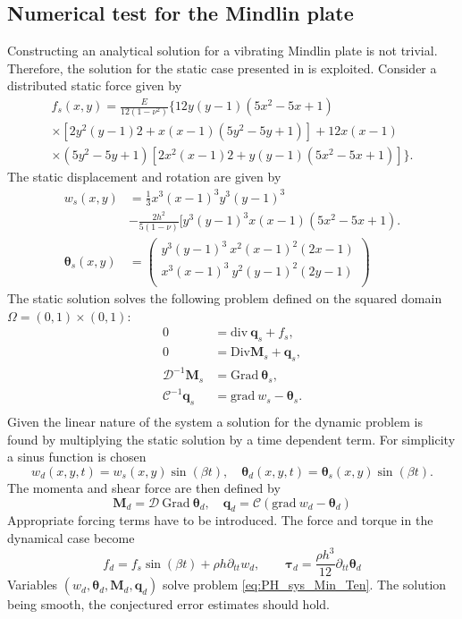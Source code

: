 \documentclass{ifacconf}
\begin{document}
\subsection{Numerical test for the Mindlin plate}
Constructing an analytical solution for a vibrating Mindlin plate is not trivial. Therefore, the solution for the static case presented in \cite{mindlinVeiga} is exploited. Consider a distributed static force given by 
\begin{equation*}
\begin{aligned}
f_s(x,y)=\frac{E}{12 (1-\nu^2)} \{12 y(y-1)(5x^2-5x+1)\\
\times [2y^2(y-1)2+x(x-1)(5y^2-5y+1)] +12x(x-1)\\
\times (5y^2-5y+1)[2x^2(x-1)2+y(y-1)(5x^2-5x+1)]\}.
\end{aligned}
\end{equation*}
The static displacement and rotation are given by
\begin{align*}
	w_s(x,y) &= \frac{1}{3} x^3(x-1)^3 y^3 (y-1)^3\\
	&-\frac{2 h^2}{5(1-\nu)}[y^3(y-1)^3 x(x-1)(5 x^2-5x+1). \\
	\bm{\theta}_{s}(x,y) &= 
	\begin{pmatrix}
	y^3(y-1)^3 \ x^2 (x-1)^2 (2x-1) \\
	x^3(x-1)^3 \ y^2 (y-1)^2 (2y-1) \\
	\end{pmatrix}
\end{align*}
The static solution solves the following problem defined on the squared domain $\Omega=(0,1)\times(0,1)$:
\begin{equation}
\begin{aligned}
0 &= \mathrm{div} \ \bm{q}_s + f_s , \\
0 &= \mathrm{Div} \bm{M}_s + \bm{q}_s, \\
\mathcal{D}^{-1} \bm{M}_s &= \mathrm{Grad} \ \bm{\theta}_s, \\
\mathcal{C}^{-1} \bm{q}_s &= \mathrm{grad} \ w_s - \bm{\theta}_s. \\
\end{aligned}
\end{equation}
Given the linear nature of the system a solution for the dynamic problem is found by multiplying the static solution by a time dependent term. For simplicity a sinus function is chosen
\[
w_d(x,y,t) = w_s(x,y) \sin(\beta t), \quad \bm{\theta}_d(x,y,t) = \bm\theta_s(x,y) \sin(\beta t).
\]
The momenta and shear force are then defined by
\[
\bm{M}_d = \mathcal{D} \ \mathrm{Grad} \ \bm{\theta}_d, \quad \bm{q}_d = \mathcal{C}(\mathrm{grad} \ w_d - \bm{\theta}_d)
\]
Appropriate forcing terms have to be introduced. The force and torque in the dynamical case become
\begin{equation*}
f_d = f_s \sin(\beta t) + \rho h \partial_{tt} w_d, \qquad
\bm{\tau}_d = \frac{\rho h^3}{12} \partial_{tt} \bm{\theta}_d
\end{equation*}
Variables $(w_d, \bm\theta_d, \bm{M}_d, \bm{q}_d)$ solve problem \eqref{eq:PH_sys_Min_Ten}. The solution being smooth, the conjectured error estimates should hold.
\end{document}
